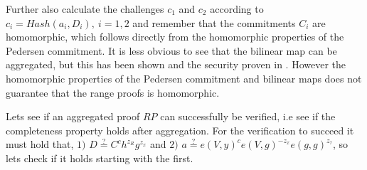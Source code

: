 Further also calculate the challenges $c_1$ and $c_2$ according to $c_i=Hash(a_i,D_i),\: i=1,2$ and remember that the  commitments $C_i$  are homomorphic, which follows directly from the homomorphic properties of the Pedersen commitment. It is less obvious to see that the bilinear map can be aggregated, but this has been shown and the security proven in \cite{aggregate_bm}. However the homomorphic properties of the Pedersen commitment and bilinear maps does not guarantee that the range proofs is homomorphic. 



Lets see if an aggregated proof $RP$ can successfully be verified, i.e see if the completeness property holds after aggregation. For the verification to succeed it must hold that, $1)$ $D\overset{?}{=} C^ch^{z_R}g^{z_x}$ and $2)$ $ a \overset{?}{=} e(V,y)^ce(V,g)^{-z_x}e(g,g)^{z_\tau}$, so lets check if it holds starting with the first.

